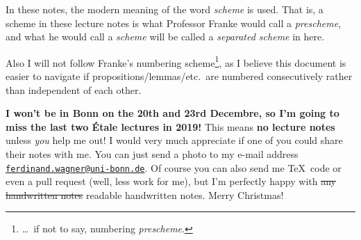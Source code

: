 \documentclass[a4paper, 10pt, oneside, DIV=9, chapterprefix=true, numbers=enddot, bibliography=totoc]{scrbook}
\DeclareRobustCommand{\Attention}{\tikz[baseline, anchor=base]\node[draw, regular polygon, regular polygon sides=3, rounded corners=2, thick, inner sep=-0.25pt] at (0,0) {\textbf{!}};}
\begin{document}
In these notes, the modern meaning of the word \emph{scheme} is used. That is, a scheme in these lecture notes is what Professor Franke would call a \emph{prescheme}, and what he would call a \emph{scheme} will be called a \emph{separated scheme} in here.

Also I will not follow Franke's numbering scheme\footnote{\ldots\ if not to say, numbering \emph{prescheme}.}, as I believe this document is easier to navigate if propositions/lemmas/etc.\ are numbered consecutively rather than independent of each other. 

\numpar*{\Attention\ Important note}\textbf{I won't be in Bonn on the 20th and 23rd Decembre, so I'm going to miss the last two Étale lectures in 2019!}
This means \textbf{no lecture notes} \dotso unless \emph{you} help me out! I would very much appreciate if one of you could share their notes with me. You can just send a photo to my e-mail address \href{mailto:ferdinand.wagner@uni-bonn.de}{\texttt{ferdinand.wagner@uni-bonn.de}}. Of course you can also send me \TeX\ code or even a pull request (well, less work for me), but I'm perfectly happy with \sout{any handwritten notes} readable handwritten notes. Merry Christmas!

\mainmatter{}

\end{document}
